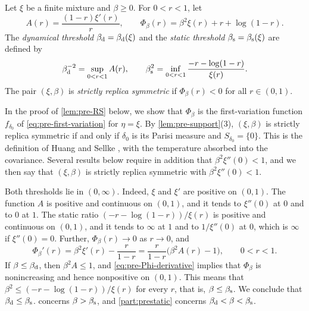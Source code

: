 \begin{definition}\label{def:pre-thresholds}
Let $\xi$ be a finite mixture and $\beta\ge0$. For $0<r<1$, let
\[
A(r)=\frac{(1-r)\xi'(r)}{r},\qquad \Phi_\beta(r)=\beta^2\xi(r)+r+\log(1-r).
\]
The \emph{dynamical threshold} $\beta_{\mathrm d}=\beta_{\mathrm d}(\xi)$ and the \emph{static threshold} $\beta_{\mathrm s}=\beta_{\mathrm s}(\xi)$ are defined by
\[
\beta_{\mathrm d}^{-2}=\sup_{0<r<1}A(r),\qquad \beta_{\mathrm s}^2=\inf_{0<r<1}\frac{-r-\log(1-r)}{\xi(r)}.
\]
The pair $(\xi,\beta)$ is \emph{strictly replica symmetric} if $\Phi_\beta(r)<0$ for all $r\in(0,1)$.
\end{definition}

In the proof of \cref{lem:pre-RS} below, we show that $\Phi_\beta$ is the first-variation function $f_{\delta_0}$ of \eqref{eq:pre-first-variation} for $\eta=\xi$. By \cref{lem:pre-support}(3), $(\xi,\beta)$ is strictly replica symmetric if and only if $\delta_0$ is its Parisi measure and $S_{\delta_0}=\{0\}$. This is the definition of Huang and Sellke \cite[Definition~3]{HuangSellke2024}, with the temperature absorbed into the covariance. Several results below require in addition that $\beta^2\xi''(0)<1$, and we then say that $(\xi,\beta)$ is strictly replica symmetric with $\beta^2\xi''(0)<1$.

\begin{remark}\label{rem:pre-thresholds}
Both thresholds lie in $(0,\infty)$. Indeed, $\xi$ and $\xi'$ are positive on $(0,1)$. The function $A$ is positive and continuous on $(0,1)$, and it tends to $\xi''(0)$ at $0$ and to $0$ at $1$. The static ratio $(-r-\log(1-r))/\xi(r)$ is positive and continuous on $(0,1)$, and it tends to $\infty$ at $1$ and to $1/\xi''(0)$ at $0$, which is $\infty$ if $\xi''(0)=0$. Further, $\Phi_\beta(r)\to0$ as $r\to0$, and
\begin{equation}\label{eq:pre-Phi-derivative}
\Phi_\beta'(r)=\beta^2\xi'(r)-\frac r{1-r}=\frac r{1-r}\big(\beta^2A(r)-1\big),\qquad 0<r<1.
\end{equation}
If $\beta\le\beta_{\mathrm d}$, then $\beta^2A\le1$, and \eqref{eq:pre-Phi-derivative} implies that $\Phi_\beta$ is nonincreasing and hence nonpositive on $(0,1)$. This means that $\beta^2\le(-r-\log(1-r))/\xi(r)$ for every $r$, that is, $\beta\le\beta_{\mathrm s}$. We conclude that $\beta_{\mathrm d}\le\beta_{\mathrm s}$.  concerns $\beta>\beta_{\mathrm s}$, and \cref{part:prestatic} concerns $\beta_{\mathrm d}<\beta<\beta_{\mathrm s}$.
\end{remark}

